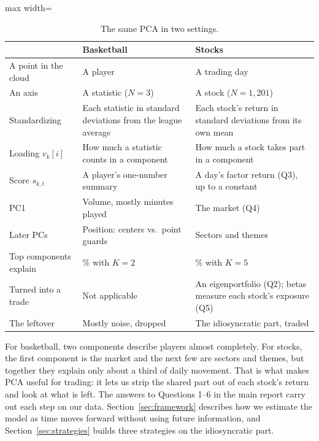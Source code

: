 \documentclass[11pt,letterpaper]{article}
\begin{document}
\begin{table}[!htbp]
\centering
\caption{The same PCA in two settings.}
\label{tab:primer-map}
\small
\begin{adjustbox}{max width=\linewidth}
\begin{tabular}{>{\raggedright\arraybackslash}p{3.4cm} >{\raggedright\arraybackslash}p{5.2cm} >{\raggedright\arraybackslash}p{5.6cm}}
\toprule
& Basketball & Stocks \\
\midrule
A point in the cloud & A player & A trading day \\
An axis & A statistic ($N=3$) & A stock ($N=1{,}201$) \\
Standardizing & Each statistic in standard deviations from the league average & Each stock's return in standard deviations from its own mean \\
Loading $v_k[i]$ & How much a statistic counts in a component & How much a stock takes part in a component \\
Score $s_{k,t}$ & A player's one-number summary & A day's factor return (Q3), up to a constant \\
PC1 & Volume, mostly minutes played & The market (Q4) \\
Later PCs & Position: centers vs.\ point guards & Sectors and themes \\
Top components explain & 93\% with $K=2$ & 35\% with $K=5$ \\
Turned into a trade & Not applicable & An eigenportfolio (Q2); betas measure each stock's exposure (Q5) \\
The leftover & Mostly noise, dropped & The idiosyncratic part, traded \\
\bottomrule
\end{tabular}
\end{adjustbox}
\end{table}

For basketball, two components describe players almost completely. For
stocks, the first component is the market and the next few are sectors
and themes, but together they explain only about a third of daily
movement. That is what makes PCA useful for trading: it lets us strip the
shared part out of each stock's return and look at what is left. The
answers to Questions 1--6 in the main report carry out each step on our data.
Section~\ref{sec:framework} describes how we estimate the model as time moves forward
without using future information, and Section~\ref{sec:strategies} builds three strategies
on the idiosyncratic part.
\end{document}
